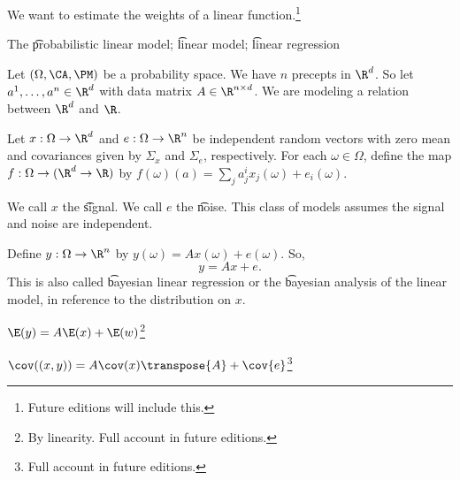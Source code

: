 
We want to estimate the weights of a linear function.\footnote{Future editions will include this.}


The \t{probabilistic linear model}; \t{linear model}; \t{linear regression}

Let $(\Omega, \CA, \PM)$ be a probability space.
We have $n$ precepts in $\R^d$.
So let $a^1, \dots, a^n \in \R^d$ with data matrix $A \in \R^{n \times d}$.
We are modeling a relation between $\R^d$ and $\R$.

Let $x: \Omega \to \R^d$ and $e: \Omega \to \R^n$ be independent random vectors with zero mean and covariances given by $\Sigma_{x}$ and $\Sigma_{e}$, respectively.
For each $\omega \in \Omega$, define the map $f: \Omega \to (\R^d \to \R)$ by $f(\omega)(a) = \sum_{j}a^i_jx_j(\omega) + e_i(\omega)$.

We call $x$ the \t{signal}.
We call $e$ the \t{noise}.
This class of models assumes the signal and noise are independent.

Define $y: \Omega \to \R^n$ by $y(\omega) = Ax(\omega) + e(\omega)$.
So,
\[
  y = Ax + e.
\]
This is also called \t{bayesian linear regression} or the \t{bayesian analysis of the linear model}, in reference to the distribution on $x$.


\begin{proposition}
  $\E(y) = A\E(x) + \E(w)$\footnote{By linearity. Full account in future editions.}
\end{proposition}

\begin{proposition}
  $\cov((x, y)) = A\cov(x)\transpose{A} + \cov{e}$\footnote{Full account in future editions.}
\end{proposition}

\blankpage
